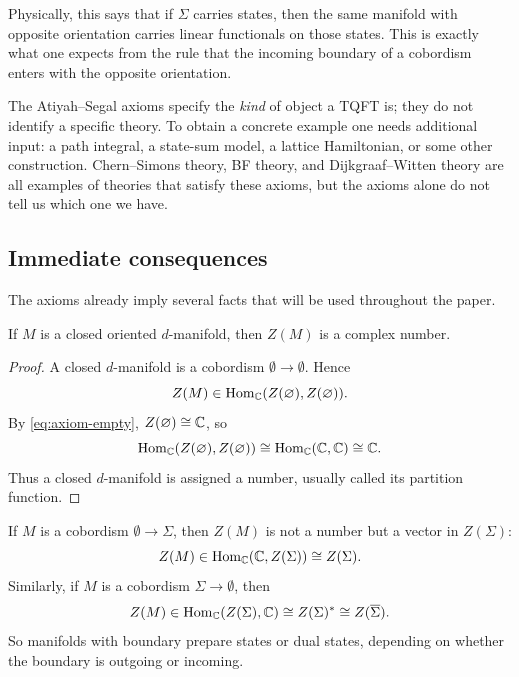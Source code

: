 \noindent Physically, this says that if $\Sigma$ carries states, then the same manifold with opposite orientation carries linear functionals on those states. This is exactly what one expects from the rule that the incoming boundary of a cobordism enters with the opposite orientation.

\begin{remark}\label{rem:axioms-not-enough}
The Atiyah--Segal axioms specify the \emph{kind} of object a TQFT is; they do not identify a specific theory. To obtain a concrete example one needs additional input: a path integral, a state-sum model, a lattice Hamiltonian, or some other construction. Chern--Simons theory, BF theory, and Dijkgraaf--Witten theory are all examples of theories that satisfy these axioms, but the axioms alone do not tell us which one we have.
\end{remark}

\subsection{Immediate consequences}

The axioms already imply several facts that will be used throughout the paper.

\begin{proposition}\label{prop:closed-manifolds-number}
If $M$ is a closed oriented $d$-manifold, then $Z(M)$ is a complex number.
\end{proposition}

\begin{proof}
A closed $d$-manifold is a cobordism $\emptyset \to \emptyset$. Hence
\begin{equation*}
Z(M) \in \operatorname{Hom}_{\mathbb{C}}(Z(\varnothing), Z(\varnothing)).
\end{equation*}
By \eqref{eq:axiom-empty}, $Z(\varnothing) \cong \mathbb{C}$, so
\begin{equation*}
\operatorname{Hom}_{\mathbb{C}}(Z(\varnothing), Z(\varnothing)) \cong \operatorname{Hom}_{\mathbb{C}}(\mathbb{C},\mathbb{C}) \cong \mathbb{C}.
\end{equation*}
Thus a closed $d$-manifold is assigned a number, usually called its partition function.
\end{proof}

\begin{remark}\label{rem:one-boundary-component}
If $M$ is a cobordism $\emptyset \to \Sigma$, then $Z(M)$ is not a number but a vector in $Z(\Sigma)$:
\begin{equation*}
Z(M) \in \operatorname{Hom}_{\mathbb{C}}(\mathbb{C}, Z(\Sigma)) \cong Z(\Sigma).
\end{equation*}
Similarly, if $M$ is a cobordism $\Sigma \to \emptyset$, then
\begin{equation*}
Z(M) \in \operatorname{Hom}_{\mathbb{C}}(Z(\Sigma), \mathbb{C}) \cong Z(\Sigma)^* \cong Z(\overline{\Sigma}).
\end{equation*}
So manifolds with boundary prepare states or dual states, depending on whether the boundary is outgoing or incoming.
\end{remark}

